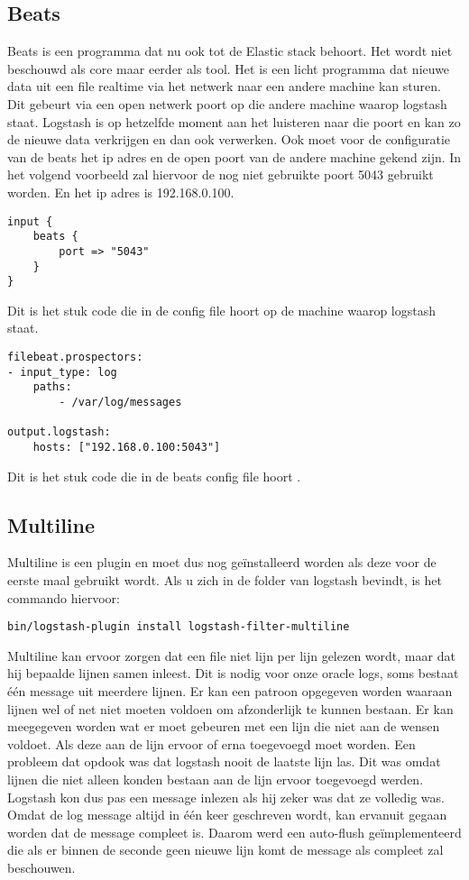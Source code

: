 \subsection{Beats}
\label{subsec:beats}

Beats is een programma dat nu ook tot de Elastic stack behoort. Het wordt niet beschouwd als core maar eerder als tool. Het is een licht programma dat nieuwe data uit een file realtime via het netwerk naar een andere machine kan sturen. Dit gebeurt via een open netwerk poort op die andere machine waarop logstash staat. Logstash is op hetzelfde moment aan het luisteren naar die poort en kan zo de nieuwe data verkrijgen en dan ook verwerken.
Ook moet voor de configuratie van de beats het ip adres en de open poort van de andere machine gekend zijn. In het volgend voorbeeld zal hiervoor de nog niet gebruikte poort  5043 gebruikt worden. En het ip adres is 192.168.0.100.
\begin{lstlisting}[frame=single]  
input {
	beats {
		port => "5043"
	}
}

\end{lstlisting}
Dit is het stuk code die in de config file hoort op de machine waarop logstash staat.
\begin{lstlisting}[frame=single]  
filebeat.prospectors:
- input_type: log
	paths:
		- /var/log/messages 
		
output.logstash:
	hosts: ["192.168.0.100:5043"]
\end{lstlisting}
Dit is het stuk code die in de beats config file hoort .


\subsection{Multiline}
\label{subsec:multiline}

Multiline is een plugin en moet dus nog geïnstalleerd worden als deze voor de eerste maal gebruikt wordt. Als u zich in de folder van logstash bevindt, is het commando hiervoor:

\begin{lstlisting}[frame=single]  
bin/logstash-plugin install logstash-filter-multiline
\end{lstlisting}

Multiline kan ervoor zorgen dat een file niet lijn per lijn gelezen wordt, maar dat hij bepaalde lijnen samen inleest. Dit is nodig voor onze oracle logs, soms bestaat één message uit meerdere lijnen.
Er kan een patroon opgegeven worden waaraan lijnen wel of net niet moeten voldoen om afzonderlijk te kunnen bestaan. Er kan meegegeven worden wat er moet gebeuren met een lijn die niet aan de wensen voldoet. Als deze aan de lijn ervoor of erna toegevoegd moet worden. 
Een probleem dat opdook was dat logstash nooit de laatste lijn las. Dit was omdat lijnen die niet alleen konden bestaan aan de lijn ervoor toegevoegd werden. Logstash kon dus pas een message inlezen als hij zeker was dat ze volledig was. Omdat de log message altijd in één keer geschreven wordt, kan ervanuit gegaan worden dat de message compleet is. Daarom werd een auto-flush geïmplementeerd die als er binnen de seconde geen nieuwe lijn komt de message als compleet zal beschouwen.

